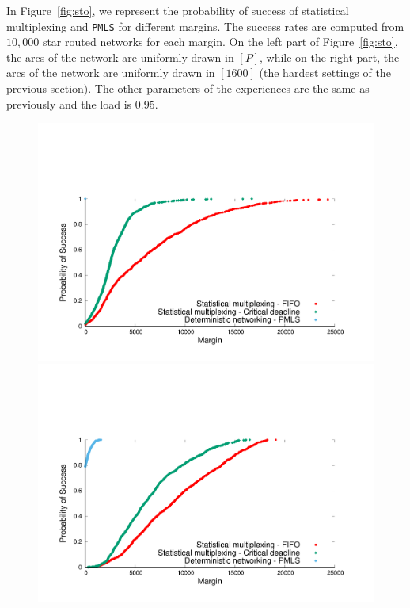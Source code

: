 \documentclass[a4paper,10pt]{journal}
\newcommand\PMLS{\texttt{PMLS}\xspace}
\begin{document}

     In Figure~\ref{fig:sto}, we represent the probability of success of statistical multiplexing and \PMLS for different margins. The success rates are computed from $10,000$ star routed networks for each margin. On the left part of Figure~\ref{fig:sto}, the arcs of the network are uniformly drawn in $[P]$, while on the right part, the arcs of the network are uniformly drawn in $[1600]$ (the hardest settings of the previous section). The other parameters of the experiences are the same as previously and the load is $0.95$. 
     
    \begin{figure}


\begin{minipage}{0.49\linewidth}
       \begin{center}
      \includegraphics[width = \linewidth]{stochasticdistrib.pdf}
      \end{center}
   \end{minipage}\hfill
\begin{minipage}{0.49\linewidth}   

       \begin{center}
     \includegraphics[width = \linewidth]{stochastic.pdf}


\end{center}
\end{minipage}
\end{figure}
\end{document}
